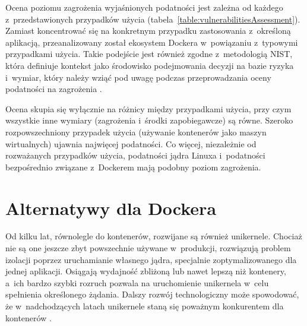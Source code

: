 Ocena poziomu zagrożenia wyjaśnionych podatności jest zależna od każdego z~przedstawionych przypadków użycia (tabela~\ref{table:vulnerabilitiesAssessment}). Zamiast koncentrować się na konkretnym przypadku zastosowania z~określoną aplikacją, przeanalizowany został ekosystem Dockera w~powiązaniu z~typowymi przypadkami użycia. Takie podejście jest również zgodne z~metodologią NIST, która definiuje kontekst jako środowisko podejmowania decyzji na bazie ryzyka i~wymiar, który należy wziąć pod uwagę podczas przeprowadzania oceny podatności na zagrożenia \cite{NISTGuideForConductingRiskAssessments}.

Ocena skupia się wyłącznie na różnicy między przypadkami użycia, przy czym wszystkie inne wymiary (zagrożenia i~środki zapobiegawcze) są równe. Szeroko rozpowszechniony przypadek użycia (używanie kontenerów jako maszyn wirtualnych) ujawnia najwięcej podatności. Co więcej, niezależnie od rozważanych przypadków użycia, podatności jądra Linuxa i~podatności bezpośrednio związane z~Dockerem mają podobny poziom zagrożenia.

\section{Alternatywy dla Dockera}

Od kilku lat, równolegle do kontenerów, rozwijane są również unikernele. Chociaż nie są one jeszcze zbyt powszechnie używane w~produkcji, rozwiązują problem izolacji poprzez uruchamianie własnego jądra, specjalnie zoptymalizowanego dla jednej aplikacji. Osiągają wydajność zbliżoną lub nawet lepszą niż kontenery, a~ich bardzo szybki rozruch pozwala na uruchomienie unikernela w~celu spełnienia określonego żądania. Dalszy rozwój technologiczny może spowodować, że w~nadchodzących latach unikernele staną się poważnym konkurentem dla kontenerów \cite{MadhavapeddyJitsu}.
